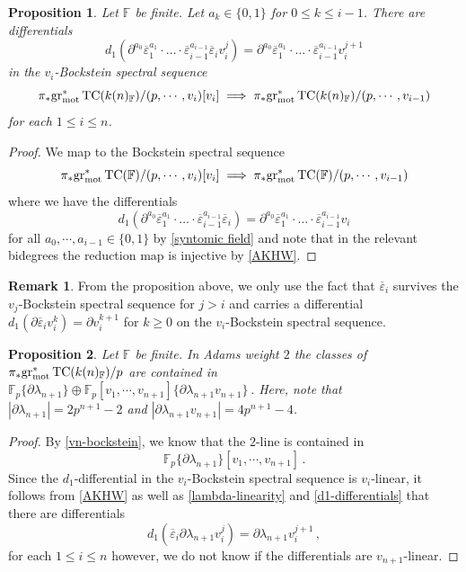 \documentclass[english,10pt]{amsart}
\newcommand{\field}{\mathbb{F}}
\newtheorem{prop}{Proposition}[section]
\theoremstyle{definition}
\newtheorem{rema}{Remark}[section]
\numberwithin{equation}{section}
\DeclareMathOperator{\TC}{TC}
\newcommand{\grmot}{\mathrm{gr}_{\textup{mot}}^*}
\begin{document}
\begin{prop}\label{d1-differentials}
Let $\field$ be finite. 
Let $a_k\in \{0,1\}$ for $0\le k\le i-1$. There are differentials 
\[ 
d_1(\partial^{a_0}\overline{\varepsilon}_1^{a_1}\cdot \ldots \cdot \overline{\varepsilon}_{i-1}^{a_{i-1}}\overline{\varepsilon}_{i}v_i^{j})
=\partial^{a_0}\overline{\varepsilon}_1^{a_1}\cdot \ldots \cdot \overline{\varepsilon}_{i-1}^{a_{i-1}}v_i^{j+1}
\]
in the $v_i$-Bockstein spectral sequence
\begin{equation}\label{BSS-k(n)}
\pi_*\grmot\TC(k(n)_{\field})/(p,\cdots ,v_{i})[v_i]\implies 
\pi_*\grmot\TC(k(n)_{\field})/(p,\cdots ,v_{i-1})
\end{equation}
for each $1\le i\le n$. 
\end{prop}
\begin{proof}


We map to the Bockstein spectral sequence 
\begin{equation}\label{BSS-Fp}
\pi_*\grmot\TC(\field)/(p,\cdots ,v_{i})[v_i]\implies 
\pi_*\grmot\TC(\field)/(p,\cdots ,v_{i-1})
\end{equation}
where we have the differentials 
\[ d_1(\partial^{a_0}\overline{\varepsilon}_1^{a_1}\cdot \ldots \cdot \overline{\varepsilon}_{i-1}^{a_{i-1}}\overline{\varepsilon}_{i})
=\partial^{a_0}\overline{\varepsilon}_1^{a_1}\cdot \ldots \cdot \overline{\varepsilon}_{i-1}^{a_{i-1}}v_i
\]
for all $a_0,\cdots ,a_{i-1}\in \{0,1\}$ by \autoref{syntomic field} and note that in the relevant bidegrees the reduction map is injective by \autoref{AKHW}. 
\end{proof}

\begin{rema}
From the proposition above, we only use the fact that $\overline{\varepsilon}_i$ survives the $v_j$-Bockstein spectral sequence for $j>i$ and carries a differential $d_1(\partial \overline{\varepsilon}_iv_i^k) = \partial v_i^{k+1}$ for $k\geq 0$ on the $v_i$-Bockstein spectral sequence. 
\end{rema}

\begin{prop}\label{2-line}
Let $\field$ be finite. In Adams weight $2$ the classes of $\pi_*\grmot\TC(k(n)_{\field})/p$ are contained in 
$\field_p\{\partial \lambda_{n+1}\}\oplus \field_p[v_1,\cdots ,v_{n+1}]\{\partial\lambda_{n+1}v_{n+1}\}$\,. Here, note that $|\partial \lambda_{n+1}|=2p^{n+1}-2$ and $|\partial \lambda_{n+1}v_{n+1}|=4p^{n+1}-4$. 
\end{prop}
\begin{proof}
By \autoref{vn-bockstein}, we know that the $2$-line is contained in 
\[ \mathbb{F}_p\{\partial \lambda_{n+1}\}[v_1,\cdots ,v_{n+1}] \,.\]
Since the $d_1$-differential in the $v_i$-Bockstein spectral sequence is $v_i$-linear, it follows from \autoref{AKHW} as well as \autoref{lambda-linearity} and \autoref{d1-differentials} that there are differentials 
\[ d_1(\overline{\varepsilon}_i \partial \lambda_{n+1}  v_i^j) = \partial \lambda_{n+1} v_i^{j+1}  \,,
\]
for each $1\le i\le n$ however, we do not know if the differentials are $v_{n+1}$-linear. 
\end{proof}
\end{document}
